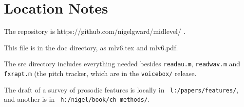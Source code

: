 \documentclass[11pt]{article}
\begin{document}
\section{Location Notes}

The repository is https://github.com/nigelgward/midlevel/ .

This file is in the doc directory, as mlv6.tex and mlv6.pdf.

The src directory includes everything needed besides 
{\tt readau.m}, {\tt readwav.m} and {\tt fxrapt.m} (the pitch
  tracker, which are in the {\tt voicebox/} release.

The draft of a survey of prosodic features is locally in {\tt
  l:/papers/features/}, and another is in {\tt
  h:/nigel/book/ch-methods/}.




\end{document}
